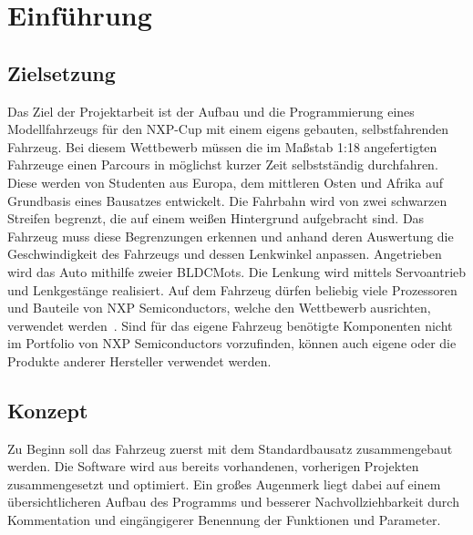 

\rhead{\thepage} \chead{} 
\cfoot{}

\section{Einführung}\label{Sec1}

\subsection{Zielsetzung}\label{Sub1Sec1}

Das Ziel der Projektarbeit ist der Aufbau und die Programmierung eines Modellfahrzeugs für den \ac{NXP}-Cup mit einem eigens gebauten, selbstfahrenden Fahrzeug. Bei diesem Wettbewerb müssen die im Maßstab 1:18 angefertigten Fahrzeuge einen Parcours in möglichst kurzer Zeit selbstständig durchfahren. Diese werden von Studenten aus Europa, dem mittleren Osten und Afrika auf Grundbasis eines Bausatzes entwickelt. Die Fahrbahn wird von zwei schwarzen Streifen begrenzt, die auf einem weißen Hintergrund aufgebracht sind. Das Fahrzeug muss diese Begrenzungen erkennen und anhand deren Auswertung die Geschwindigkeit des Fahrzeugs und dessen Lenkwinkel anpassen. Angetrieben wird das Auto mithilfe zweier \acp{BLDCMot}. Die Lenkung wird mittels Servoantrieb und Lenkgestänge realisiert. Auf dem Fahrzeug dürfen beliebig viele Prozessoren und Bauteile von NXP Semiconductors, welche den Wettbewerb ausrichten, verwendet werden~\cite{MWil}. Sind für das eigene Fahrzeug benötigte Komponenten nicht im Portfolio von NXP Semiconductors vorzufinden, können auch eigene oder die Produkte anderer Hersteller verwendet werden. 

\subsection{Konzept}\label{Sub1Sec2}

Zu Beginn soll das Fahrzeug zuerst mit dem Standardbausatz zusammengebaut werden. Die Software wird aus bereits vorhandenen, vorherigen Projekten zusammengesetzt und optimiert. Ein großes Augenmerk liegt dabei auf einem übersichtlicheren Aufbau des Programms und besserer Nachvollziehbarkeit durch Kommentation und eingängigerer Benennung der Funktionen und Parameter.\vspace{11pt}

